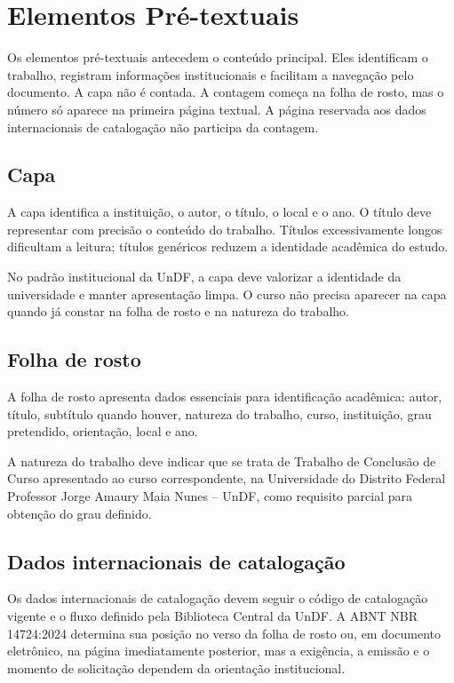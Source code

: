 \chapter{Elementos Pré-textuais}

Os elementos pré-textuais antecedem o conteúdo principal. Eles identificam o trabalho, registram informações institucionais e facilitam a navegação pelo documento. A capa não é contada. A contagem começa na folha de rosto, mas o número só aparece na primeira página textual. A página reservada aos dados internacionais de catalogação não participa da contagem.

\requisitonormativo

\section{Capa}

A capa identifica a instituição, o autor, o título, o local e o ano. O título deve representar com precisão o conteúdo do trabalho. Títulos excessivamente longos dificultam a leitura; títulos genéricos reduzem a identidade acadêmica do estudo.

No padrão institucional da UnDF, a capa deve valorizar a identidade da universidade e manter apresentação limpa. O curso não precisa aparecer na capa quando já constar na folha de rosto e na natureza do trabalho.

\section{Folha de rosto}

A folha de rosto apresenta dados essenciais para identificação acadêmica: autor, título, subtítulo quando houver, natureza do trabalho, curso, instituição, grau pretendido, orientação, local e ano.

A natureza do trabalho deve indicar que se trata de Trabalho de Conclusão de Curso apresentado ao curso correspondente, na Universidade do Distrito Federal Professor Jorge Amaury Maia Nunes -- UnDF, como requisito parcial para obtenção do grau definido.

\section{Dados internacionais de catalogação}

Os dados internacionais de catalogação devem seguir o código de catalogação vigente e o fluxo definido pela Biblioteca Central da UnDF. A ABNT NBR 14724:2024 determina sua posição no verso da folha de rosto ou, em documento eletrônico, na página imediatamente posterior, mas a exigência, a emissão e o momento de solicitação dependem da orientação institucional.

